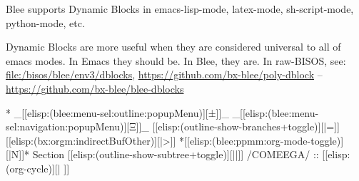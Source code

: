 \begin{whenOrg}
\begin{verblatex}
\begin{frame}[fragile,plain,label=dblocksEverywhere]
    Blee supports Dynamic Blocks in emacs-lisp-mode, latex-mode, sh-script-mode,
    python-mode, etc.

    \bigskip

    Dynamic Blocks are more useful when they are considered universal to all of emacs
    modes. In Emacs they should be. In Blee, they are. In raw-BISOS, see:  \url{file:/bisos/blee/env3/dblocks},
    \url{https://github.com/bx-blee/poly-dblock} -- \url{https://github.com/bx-blee/blee-dblocks}




\end{frame}
\end{verblatex}


\begin{whenOrg}
*  _[[elisp:(blee:menu-sel:outline:popupMenu)][±]]_ _[[elisp:(blee:menu-sel:navigation:popupMenu)][Ξ]]_ [[elisp:(outline-show-branches+toggle)][|=]] [[elisp:(bx:orgm:indirectBufOther)][|>]] *[[elisp:(blee:ppmm:org-mode-toggle)][|N]]*  Section    [[elisp:(outline-show-subtree+toggle)][||]]   /COMEEGA/ ::  [[elisp:(org-cycle)][| ]]
\end{whenOrg}


\end{whenOrg}
